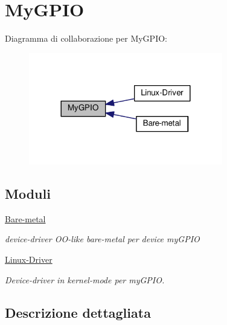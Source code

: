 \hypertarget{group__my_g_p_i_o}{\section{My\+G\+P\+I\+O}
\label{group__my_g_p_i_o}
}
Diagramma di collaborazione per My\+G\+P\+I\+O\+:\nopagebreak
\begin{figure}[H]
\begin{center}
\leavevmode
\includegraphics[width=240pt]{group__my_g_p_i_o}
\end{center}
\end{figure}
\subsection*{Moduli}
\begin{DoxyCompactItemize}
\item 
\hyperlink{group__bare-metal}{Bare-\/metal}
\begin{DoxyCompactList}\small\item\em device-\/driver O\+O-\/like bare-\/metal per device my\+G\+P\+I\+O \end{DoxyCompactList}\item 
\hyperlink{group___linux-_driver}{Linux-\/\+Driver}
\begin{DoxyCompactList}\small\item\em Device-\/driver in kernel-\/mode per my\+G\+P\+I\+O. \end{DoxyCompactList}\end{DoxyCompactItemize}


\subsection{Descrizione dettagliata}
